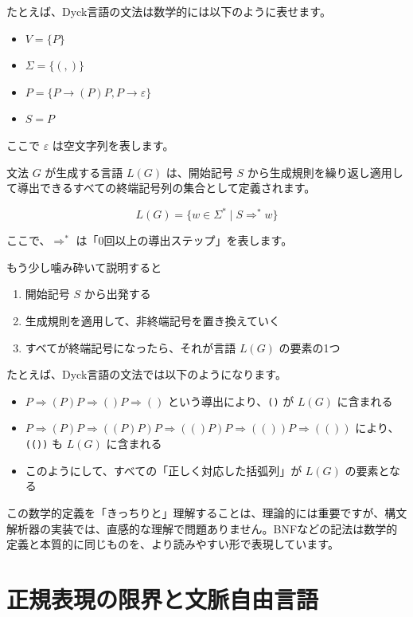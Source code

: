 たとえば、Dyck言語の文法は数学的には以下のように表せます。

\begin{itemize}
\item
  \(V = \{P\}\)
\item
  \(\Sigma = \{(, )\}\)
\item
  \(P = \{P \rightarrow (P)P, P \rightarrow \varepsilon\}\)
\item
  \(S = P\)
\end{itemize}

ここで \(\varepsilon\) は空文字列を表します。

文法 \(G\) が生成する言語 \(L(G)\) は、開始記号 \(S\)
から生成規則を繰り返し適用して導出できるすべての終端記号列の集合として定義されます。

\[L(G) = \{w \in \Sigma^* \mid S \Rightarrow^* w\}\]

ここで、\(\Rightarrow^*\) は「0回以上の導出ステップ」を表します。

もう少し噛み砕いて説明すると

\begin{enumerate}
\item
  開始記号 \(S\) から出発する
\item
  生成規則を適用して、非終端記号を置き換えていく
\item
  すべてが終端記号になったら、それが言語 \(L(G)\) の要素の1つ
\end{enumerate}

たとえば、Dyck言語の文法では以下のようになります。

\begin{itemize}
\item
  \(P \Rightarrow (P)P \Rightarrow ()P \Rightarrow ()\)
  という導出により、\texttt{()} が \(L(G)\) に含まれる
\item
  \(P \Rightarrow (P)P \Rightarrow ((P)P)P \Rightarrow (()P)P \Rightarrow (())P \Rightarrow (())\)
  により、\texttt{(())} も \(L(G)\) に含まれる
\item
  このようにして、すべての「正しく対応した括弧列」が \(L(G)\)
  の要素となる
\end{itemize}

この数学的定義を「きっちりと」理解することは、理論的には重要ですが、構文解析器の実装では、直感的な理解で問題ありません。BNFなどの記法は数学的定義と本質的に同じものを、より読みやすい形で表現しています。

\section{正規表現の限界と文脈自由言語}

